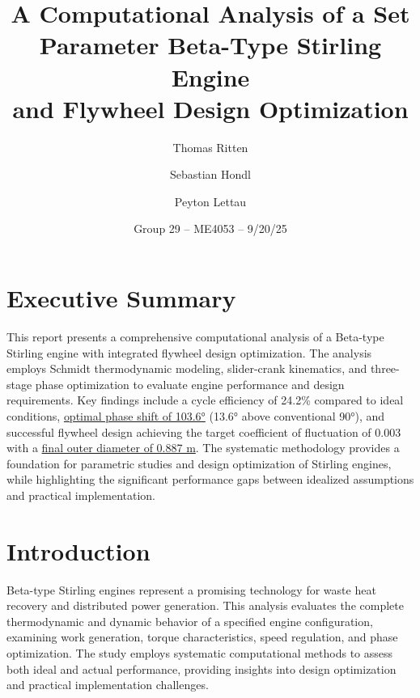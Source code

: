 \documentclass[12pt]{article}
\title{A Computational Analysis of a Set Parameter Beta-Type Stirling Engine\\and Flywheel Design Optimization}
\author{Thomas Ritten \and Sebastian Hondl \and Peyton Lettau}
\date{Group 29 -- ME4053 -- 9/20/25}
\begin{document}
\maketitle
\section*{Executive Summary}
This report presents a comprehensive computational analysis of a Beta-type Stirling engine with integrated flywheel design optimization. The analysis employs Schmidt thermodynamic modeling, slider-crank kinematics, and three-stage phase optimization to evaluate engine performance and design requirements. Key findings include a cycle efficiency of 24.2\% compared to ideal conditions, \underline{optimal phase shift of 103.6°} (13.6° above conventional 90°), and successful flywheel design achieving the target coefficient of fluctuation of 0.003 with a \underline{final outer diameter of 0.887 m}. The systematic methodology provides a foundation for parametric studies and design optimization of Stirling engines, while highlighting the significant performance gaps between idealized assumptions and practical implementation.

\section{Introduction}
Beta-type Stirling engines represent a promising technology for waste heat recovery and distributed power generation. This analysis evaluates the complete thermodynamic and dynamic behavior of a specified engine configuration, examining work generation, torque characteristics, speed regulation, and phase optimization. The study employs systematic computational methods to assess both ideal and actual performance, providing insights into design optimization and practical implementation challenges.
\end{document}
